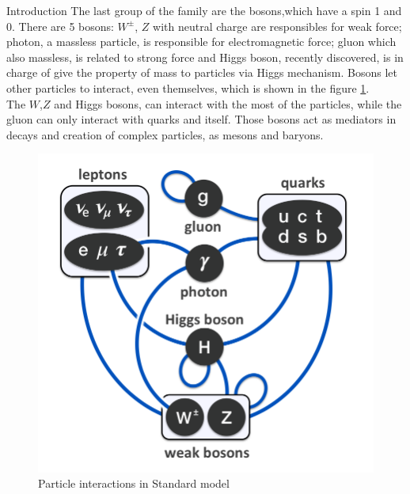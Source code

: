 \begin{chapter}{Introduction}
The last group of the family are the bosons,which have a spin 1 and 0. 
There are 5 bosons: $W^{\pm}$, $Z$ with neutral charge are responsibles for weak force; photon, a massless particle, is responsible for electromagnetic force; gluon which also massless, is related to strong force and Higgs boson, recently discovered, is in charge of give the property of mass to particles via Higgs mechanism. Bosons let other particles to interact, even themselves, which is shown in the figure \ref{sm}. 
\\
The $W$,$Z$ and Higgs bosons, can interact with the most of the particles, while the gluon can only interact with quarks and itself.
Those bosons act as mediators in decays and creation of complex
particles, as mesons and baryons.\\


\begin{center}
  \begin{figure}[!htbp]
    \centering
    \includegraphics[scale=0.35]{Chapter1/sm.png}
    \caption{Particle interactions in Standard model}
    \label{sm}
  \end{figure}
\end{center}


\end{chapter}
